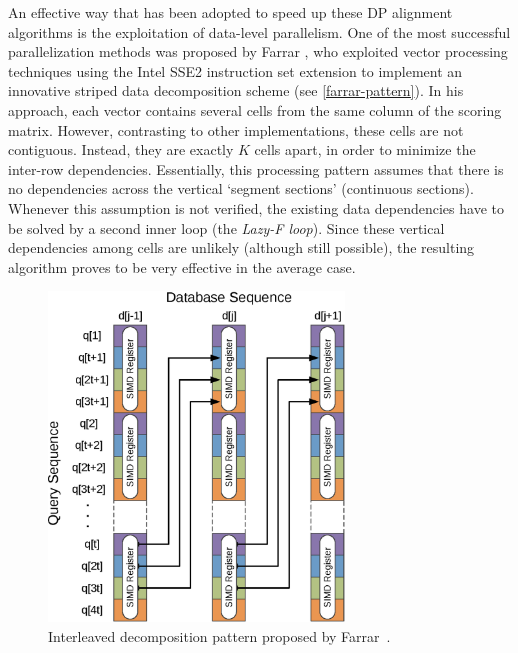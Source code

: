 \documentclass{bmcart}
\begin{document}
An effective way that has been adopted to speed up these \ac{DP} alignment algorithms is the exploitation of data-level parallelism. One of the most successful parallelization methods was proposed by Farrar \cite{farrar}, who exploited vector processing techniques using the Intel SSE2 instruction set extension to implement an innovative striped data decomposition scheme (see \autoref{farrar-pattern}). In his approach, each vector contains several cells from the same column of the scoring matrix. However, contrasting to other implementations, these cells are not contiguous. Instead, they are exactly $K$ cells apart, in order to minimize the inter-row dependencies. Essentially, this processing pattern assumes that there is no dependencies across the vertical `segment sections' (continuous sections). Whenever this assumption is not verified, the existing data dependencies have to be solved by a second inner loop (the \emph{Lazy-F loop}). Since these vertical dependencies among cells are unlikely (although still possible), the resulting algorithm proves to be very effective in the average case.

\begin{figure}[h!]
  \centering
  \includegraphics[width=0.7\textwidth]{img/farrar-pattern.eps}  
  \caption{Interleaved decomposition pattern proposed by Farrar~\cite{farrar}.}
  \label{farrar-pattern}
\end{figure}
\end{document}

